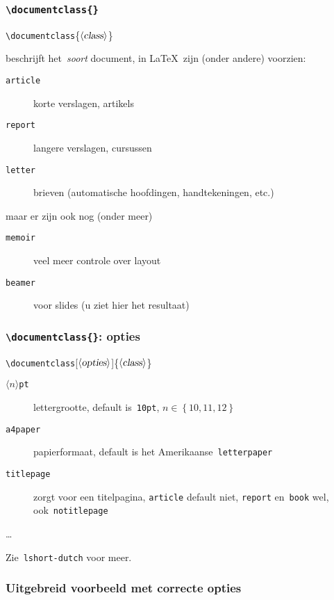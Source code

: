 \begin{frame}
  \frametitle{\texttt{\textbackslash documentclass\{\}}}

  \textcolor{uagreen}{\texttt{\textbackslash documentclass}}\{$\langle\textsl{class}\rangle$\}

  beschrijft het~\emph{soort} document, in \LaTeX~zijn (onder andere) voorzien:
  \begin{description}
	  \item[\texttt{article}] korte verslagen, artikels
	  \item[\texttt{report}] langere verslagen, cursussen
	  \item[\texttt{letter}] brieven (automatische hoofdingen, handtekeningen, etc.)
  \end{description}

  maar er zijn ook nog (onder meer)
  \begin{description}
	  \item[\texttt{memoir}] veel meer controle over layout
	  \item[\texttt{beamer}] voor slides (u ziet hier het resultaat)
  \end{description}
\end{frame}

\begin{frame}[fragile]
  \frametitle{\texttt{\textbackslash documentclass\{\}}: opties}

  \textcolor{uagreen}{\texttt{\textbackslash documentclass}}[$\langle\textsl{opties}\rangle$]\{$\langle\textsl{class}\rangle$\}

  \begin{description}
	  \item[\texttt{$\langle n\rangle$pt}] lettergrootte, default is~\texttt{10pt}, $n\in\left\{ 10,11,12 \right\}$
	  \item[\texttt{a4paper}] papierformaat, default is het Amerikaanse~\texttt{letterpaper}
	  \item[\texttt{titlepage}] zorgt voor een titelpagina, \texttt{article} default niet, \texttt{report} en~\texttt{book} wel, ook~\texttt{notitlepage}
	  \item[\ldots] 
  \end{description}

  Zie~\texttt{lshort-dutch} voor meer.
\end{frame}

\begin{frame}
  \frametitle{Uitgebreid voorbeeld met correcte opties}
  \inputminted{latex}{test-3.tex}
\end{frame}

